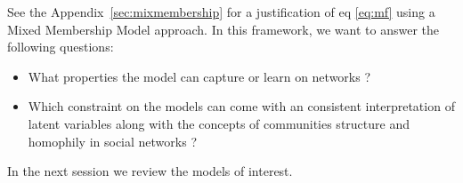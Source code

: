 See the Appendix~\ref{sec:mixmembership} for a justification of eq \eqref{eq:mf} using a Mixed Membership Model approach. In this framework, we want to answer the following questions:
\begin{itemize}
	\item What properties the model can capture or learn on networks ?
	\item Which constraint on the models can come with an consistent interpretation of latent variables along with the concepts of communities structure and homophily in social networks  ?
\end{itemize} 

In the next session we review the models of interest.

